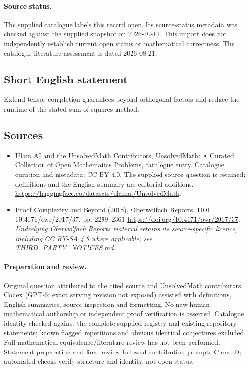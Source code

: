 \documentclass[11pt]{article}
\begin{document}
\paragraph{Source status.}
The supplied catalogue labels this record open. Its source-status metadata was checked against the supplied snapshot on 2026-10-11. This import does not independently establish current open status or mathematical correctness. The catalogue literature assessment is dated 2026-08-21.
\subsection{Short English statement}
Extend tensor-completion guarantees beyond orthogonal factors and reduce the runtime of the stated sum-of-squares method.
\subsection{Sources}
\begin{itemize}
\item[S1] Ulam AI and the UnsolvedMath Contributors, UnsolvedMath: A Curated Collection of Open Mathematics Problems, catalogue entry. Catalogue curation and metadata: CC BY 4.0. The supplied source question is retained; definitions and the English summary are editorial additions.
\url{https://huggingface.co/datasets/ulamai/UnsolvedMath}.
\item[S2] Proof Complexity and Beyond (2018), Oberwolfach Reports, DOI 10.4171/owr/2017/37, pp. 2299--2361
\url{https://doi.org/10.4171/owr/2017/37}.
\textit{Underlying Oberwolfach Reports material retains its source-specific licence, including CC BY-SA 4.0 where applicable; see THIRD\_PARTY\_NOTICES.md.}
\end{itemize}
\paragraph{Preparation and review.}
Original question attributed to the cited source and UnsolvedMath contributors. Codex (GPT-6; exact serving revision not exposed) assisted with definitions, English summaries, source inspection and formatting. No new human mathematical authorship or independent proof verification is asserted. Catalogue identity checked against the complete supplied registry and existing repository statements; known flagged repetitions and obvious identical conjectures excluded. Full mathematical-equivalence/literature review has not been performed. Statement preparation and final review followed contribution prompts C and D; automated checks verify structure and identity, not open status.
\label{end:statement}
\end{document}
